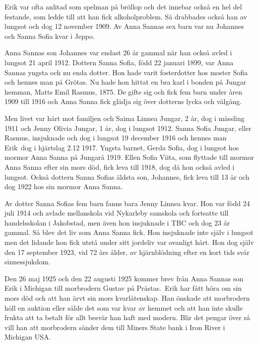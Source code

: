 Erik var ofta anlitad som spelman på bröllop och det innebar också en hel del festande, som ledde till att han fick alkoholproblem. Så drabbades också han av lungsot och dog 12 november 1909. Av Anna Sannas sex barn var nu Johannes och Sanna Sofia kvar i Jeppo.

Anna Sannas son Johannes var endast 26 år gammal när han också avled i lungsot 21 april 1912. Dottern Sanna Sofia, född 22 januari 1899, var Anna Sannas yngsta och nu enda dotter. Hon hade varit fosterdotter hos moster Sofia och hennes man på Grötas. Nu hade hon hittat en bra karl i bonden på Jungar hemman, Matts Emil Rasmus,  1875.
De gifte sig och fick fem barn under åren 1909 till 1916 och Anna Sanna fick glädja sig över dotterns lycka och välgång.

Men livet var hårt mot familjen och Saima Linnea Jungar, 2 år, dog i mässling 1911 och Jenny Olivia Jungar, 1 år, dog i lungsot 1912. Sanna Sofia Jungar, eller Rasmus, insjuknade och dog i lungsot 19 december 1916 och hennes man Erik dog i hjärtslag 2.12 1917. Yngsta barnet, Gerda Sofia, dog i lungsot hos mormor Anna Sanna på Jungarå 1919. Ellen Sofia Viita, som flyttade till mormor Anna Sanna efter sin mors död, fick leva till 1918, dog då hon också avled i lungsot. Också dottern Sanna Sofias äldsta son, Johannes, fick leva till 13 år och dog 1922 hos sin mormor Anna Sanna.

Av dotter Sanna Sofias fem barn fanns bara Jenny Linnea kvar. Hon var född 24 juli 1914 och avlade mellanskola vid Nykarleby samskola och fortsatte till handelsskolan i Jakobstad, men även hon insjuknade i TBC och dog 23 år gammal.
Så blev det liv som Anna Sanna fick. Hon insjuknade inte själv i lungsot men det lidande hon fick utstå under sitt jordeliv var ovanligt hårt. Hon dog själv den 17 september 1923, vid 72 års ålder, av hjärnblödning efter en kort tids svår sinnessjukdom.


Den 26 maj 1925 och den 22 augusti 1925 kommer brev från Anna Sannas son Erik i Michigan till morbrodern Gustav på Prästas. Erik har fått höra om sin mors död och att han ärvt sin mors kvarlåtenskap. Han önskade att morbrodern höll en auktion eller sålde det som var kvar av hemmet och att han inte skulle frukta att ta betalt för allt besvär han haft med modern. Blir det pengar över så vill han att morbrodern sänder dem till Miners State bank i Iron River i Michigan USA.

